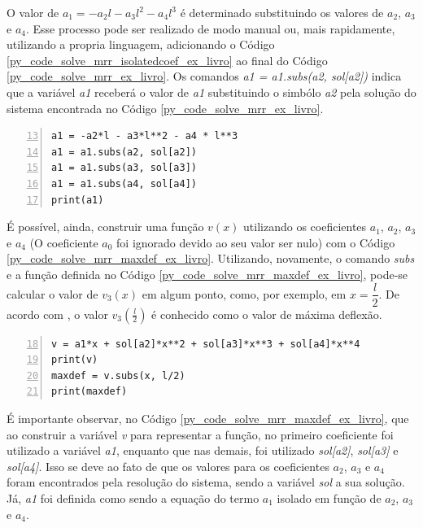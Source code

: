 \documentclass[
	12pt,				%
	openright,			%
    twoside,			%
	a4paper,			%
	english,			%
	french,				%
	spanish,			%
	brazil				%
	]{abntex2}
\numberwithin{lema}{chapter}
\numberwithin{teorema}{chapter}
\numberwithin{definicao}{chapter}
\numberwithin{exemplo}{chapter}
\numberwithin{figure}{chapter}
\begin{document}
O valor de $a_1=-a_2l-a_3l^2-a_4l^3$ é determinado substituindo os valores de $a_2$, $a_3$ e $a_4$. Esse processo pode ser realizado de modo manual ou, mais rapidamente, utilizando a propria linguagem, adicionando o Código \ref{py_code_solve_mrr_isolatedcoef_ex_livro} ao final do Código \ref{py_code_solve_mrr_ex_livro}. Os comandos \textit{a1 = a1.subs(a2, sol[a2])} indica que a variável \textit{a1} receberá o valor de \textit{a1} substituindo o simbólo \textit{a2} pela solução do sistema encontrada no Código \ref{py_code_solve_mrr_ex_livro}.

\begin{lstlisting}[style=Python, xleftmargin=2em, numbers=left, firstnumber=13, caption={Código para a determinação do coeficiente $a_1$ do Exemplo \ref{ex:mrr_ex_livro}}, captionpos=t, label=py_code_solve_mrr_isolatedcoef_ex_livro]
a1 = -a2*l - a3*l**2 - a4 * l**3
a1 = a1.subs(a2, sol[a2])
a1 = a1.subs(a3, sol[a3])
a1 = a1.subs(a4, sol[a4])
print(a1)
\end{lstlisting}

{\color{red}É possível, ainda, construir uma função $v(x)$ utilizando os coeficientes $a_1$, $a_2$, $a_3$ e $a_4$ (O coeficiente $a_0$ foi ignorado devido ao seu valor ser nulo) com o Código \ref{py_code_solve_mrr_maxdef_ex_livro}. Utilizando, novamente, o comando \textit{subs} e a função definida no Código \ref{py_code_solve_mrr_maxdef_ex_livro}, pode-se calcular o valor de $v_3(x)$ em algum ponto, como, por exemplo, em $x=\dfrac{l}{2}$. De acordo com , o valor $v_3(\frac{l}{2})$ é conhecido como o valor de máxima deflexão.}

\begin{lstlisting}[style=Python, xleftmargin=2em, numbers=left, firstnumber=18, caption={Código para a definição da função $v_3(x)$ do Exemplo \ref{ex:mrr_ex_livro}}, captionpos=t, label=py_code_solve_mrr_maxdef_ex_livro]
v = a1*x + sol[a2]*x**2 + sol[a3]*x**3 + sol[a4]*x**4
print(v)
maxdef = v.subs(x, l/2)
print(maxdef)
\end{lstlisting}

É importante observar, no Código \ref{py_code_solve_mrr_maxdef_ex_livro}, que ao construir a variável \textit{v} para representar a função, no primeiro coeficiente foi utilizado a variável \textit{a1}, enquanto que nas demais, foi utilizado \textit{sol[a2]}, \textit{sol[a3]} e \textit{sol[a4]}. Isso se deve ao fato de que os valores para os coeficientes $a_2$, $a_3$ e $a_4$ foram encontrados pela resolução do sistema, sendo a variável \textit{sol} a sua solução. Já, \textit{a1} foi definida como sendo a equação do termo $a_1$ isolado em função de $a_2$, $a_3$ e $a_4$.
\end{document}
